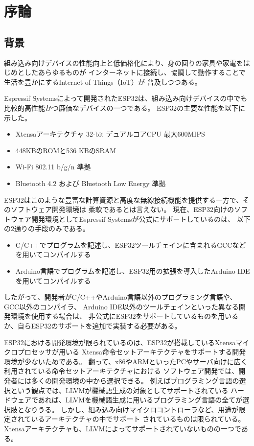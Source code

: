 \chapter{序論}
\label{chap:introduction}

\section{背景}
\label{section:background}

組み込み向けデバイスの性能向上と低価格化により、身の回りの家具や家電をはじめとしたあらゆるものが
インターネットに接続し、協調して動作することで生活を豊かにするInternet of Things（IoT）が
普及しつつある。

Espressif Systemsによって開発されたESP32\cite{esp32}は、組み込み向けデバイスの中でも
比較的高性能かつ廉価なデバイスの一つである。
ESP32の主要な性能を以下に示した。

\begin{itemize}
  \item Xtensaアーキテクチャ 32-bit デュアルコアCPU 最大600MIPS
  \item 448KBのROMと536 KBのSRAM
  \item Wi-Fi 802.11 b/g/n 準拠
  \item Bluetooth 4.2 および Bluetooth Low Energy 準拠
\end{itemize}

ESP32はこのような豊富な計算資源と高度な無線接続機能を提供する一方で、そのソフトウェア開発環境は
柔軟であるとは言えない。
現在、ESP32向けのソフトウェア開発環境としてEspressif Systemsが公式にサポートしているのは、
以下の2通りの手段のみである。

\begin{itemize}
  \item C/C++でプログラムを記述し、ESP32ツールチェイン\cite{esp_toolchain}に含まれるGCCなどを用いてコンパイルする
  \item Arduino言語でプログラムを記述し、ESP32用の拡張\cite{esp_arduino}を導入したArduino IDE\cite{arduino_ide}を用いてコンパイルする
\end{itemize}

したがって、開発者がC/C++やArduino言語以外のプログラミング言語や、GCC以外のコンパイラ、
Arduino IDE以外のツールチェインといった異なる開発環境を使用する場合は、
非公式にESP32をサポートしているものを用いるか、自らESP32のサポートを追加で実装する必要がある。

ESP32における開発環境が限られているのは、ESP32が搭載しているXtensaマイクロプロセッサが用いる
Xtensa命令セットアーキテクチャ\cite{xtensa_isa}をサポートする開発環境が少ないためである。
翻って、x86やARMといったPCやサーバ向けに広く利用されている命令セットアーキテクチャにおける
ソフトウェア開発では、開発者には多くの開発環境の中から選択できる。
例えばプログラミング言語の選択という観点では、LLVMが機械語生成の対象としてサポートされている
ハードウェアであれば、LLVMを機械語生成に用いるプログラミング言語の全てが選択肢となりうる。
しかし、組み込み向けマイクロコントローラなど、用途が限定されているアーキテクチャの中でサポート
されているものは限られている\cite{llvm_matrix}。
Xtensaアーキテクチャも、LLVMによってサポートされていないものの一つである。

